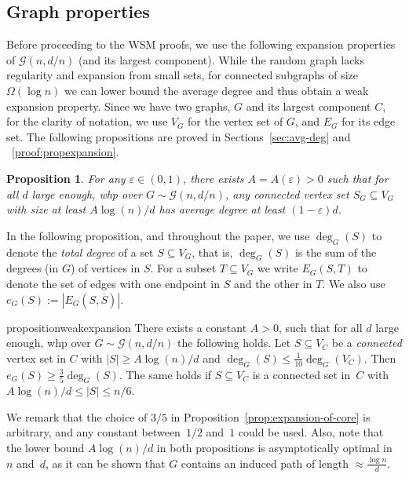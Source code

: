 \documentclass[11pt]{article}
\theoremstyle{plain}
\newtheorem{proposition}[theorem]{Proposition}
\let\epsilon=\varepsilon
\newcommand{\G}{\mathcal{G}}
\newcommand{\1}{\mathbb{1}}
\begin{document}
\subsection{Graph properties}\label{sec:graph-properties}

Before proceeding to the WSM proofs, we  use the following expansion properties of \(\G(n,d/n)\) (and its largest component). While the random graph lacks 
regularity and expansion from small sets, for connected subgraphs of size \(\Omega(\log n)\) we can lower bound the average degree and thus obtain a weak expansion property. Since we have two graphs, \(G\) and its largest component \(C\), for the clarity of notation, we use \(V_G\) for the vertex set of \(G\), and \(E_G\) for its edge set.
The following propositions are proved in Sections~\ref{sec:avg-deg} and ~\ref{proof:propexpansion}.

\begin{proposition}\label{prop:average-degree-of-connected-sets}
    For any \(\epsilon\in(0,1)\), there exists \(A = A(\epsilon) > 0\) such that for all \(d\) large enough, whp over \(G\sim\G(n,d/n)\), any \emph{connected} vertex set \(S_G\subseteq V_G\) with size at least \({A\log (n)}/{d}\) has average degree at least \((1-\epsilon)d\).
\end{proposition}

 

In the following proposition, and throughout the paper, we use $\deg_G(S)$ to denote the \textit{total degree} of a set $S\subseteq V_G$, that is, $\deg_G(S)$  is
the sum of the degrees (in $G$) of vertices in $S$. For a subset $T \subseteq V_G$ we write \(E_G(S,T)\) to denote the set of edges with one endpoint in \(S\) and the other in \(T\). We also use \(e_G(S) := |E_G(S,\overline S)|\). 

\begin{restatable}{proposition}{weakexpansion}\label{prop:expansion-of-core}
    There exists a constant \(A > 0\), such that for all \(d\) large enough, whp over \(G\sim\G(n,d/n)\) the following holds.
Let \(S\subseteq V_C\) be a \emph{connected} vertex set in \(C\) with \(|S|\geq {A\log (n)}{/d}\) and \(\deg_G(S)\leq \tfrac{1}{10}\deg_G(V_C)\). Then 
\(e_G(S) \geq \tfrac{3}{5} \deg_G(S)\).
The same holds 
if $S \subseteq V_C$ is a connected set in~$C$ with   \({A\log (n)}/{d}\leq |S|\leq n /6\).
\end{restatable}

We remark that the choice of
$3/5$ in Proposition~\ref{prop:expansion-of-core}  is arbitrary, and any constant between~$1/2$ and~$1$ could be used. Also, 
note that the lower bound $A \log(n)/d$  in both propositions 
is 
asymptotically  optimal in~$n$ and~$d$, as it can be shown that \(G\) contains an induced path of length \(\approx \frac{\log n}{d}\).
\end{document}
